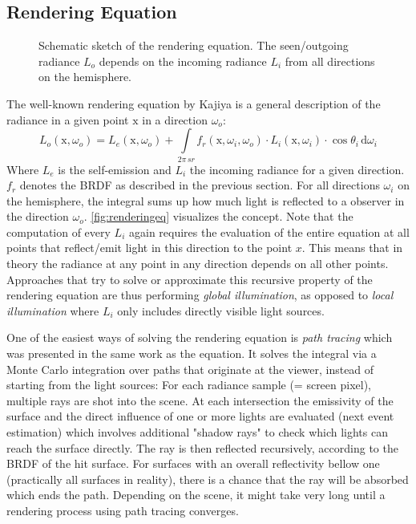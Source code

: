 \documentclass[thesis.tex]{subfiles}
\begin{document}
\subsection{Rendering Equation} \label{sec:preq:renderingeq}
\begin{figure}[h]
\centering
{}
\caption{Schematic sketch of the rendering equation. The seen/outgoing radiance $L_o$ depends on the incoming radiance $L_i$ from all directions on the hemisphere. }
\label{fig:renderingeq}
\end{figure}
The well-known rendering equation by Kajiya \cite{bib:renderingequation} is a general description of the radiance in a given point $\mathrm{x}$ in a direction $\omega_o$:
\begin{equation}
L_o(\mathrm{x}, \omega_o) = L_e(\mathrm{x}, \omega_o) + \int\limits_{2\pi\,sr} f_r(\mathrm{x}, \omega_i, \omega_o) \cdot L_i(\mathrm{x}, \omega_i) \cdot \cos\theta_i \, \mathrm{d}\omega_i
\end{equation}
Where $L_e$ is the self-emission and $L_i$ the incoming radiance for a given direction.
$f_r$ denotes the BRDF as described in the previous section.
For all directions $\omega_i$ on the hemisphere, the integral sums up how much light is reflected to a observer in the direction $\omega_o$.
\autoref{fig:renderingeq} visualizes the concept.
Note that the computation of every $L_i$ again requires the evaluation of the entire equation at all points that reflect/emit light in this direction to the point $x$.
This means that in theory the radiance at any point in any direction depends on all other points.
Approaches that try to solve or approximate this recursive property of the rendering equation are thus performing \emph{global illumination}, as opposed to \emph{local illumination} where $L_i$ only includes directly visible light sources.

One of the easiest ways of solving the rendering equation is \emph{path tracing} which was presented in the same work as the equation.
It solves the integral via a Monte Carlo integration over paths that originate at the viewer, instead of starting from the light sources:
For each radiance sample (= screen pixel), multiple rays are shot into the scene.
At each intersection the emissivity of the surface and the direct influence of one or more lights are evaluated (next event estimation) which involves additional "shadow rays" to check which lights can reach the surface directly. 
The ray is then reflected recursively, according to the BRDF of the hit surface.
For surfaces with an overall reflectivity bellow one (practically all surfaces in reality), there is a chance that the ray will be absorbed which ends the path.
Depending on the scene, it might take very long until a rendering process using path tracing converges.
\end{document}
